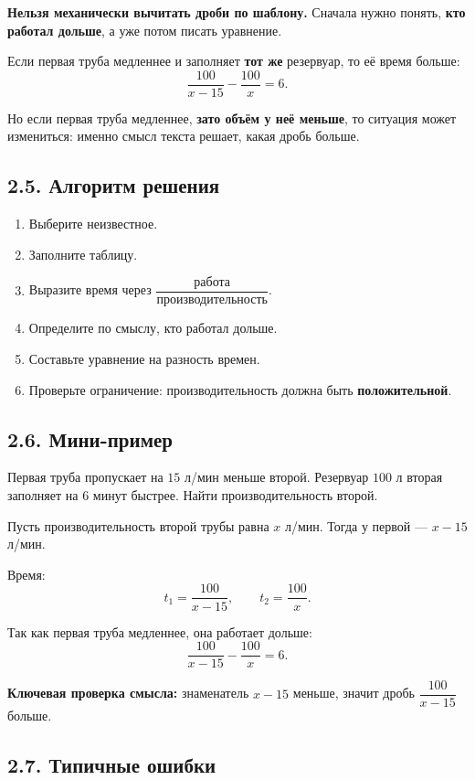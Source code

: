 \documentclass[a4paper,12pt]{article}
\begin{document}
\textbf{Нельзя механически вычитать дроби по шаблону.}  
Сначала нужно понять, \textbf{кто работал дольше}, а уже потом писать уравнение.

Если первая труба медленнее и заполняет \textbf{тот же} резервуар, то её время больше:
\[
\frac{100}{x-15}-\frac{100}{x}=6.
\]

Но если первая труба медленнее, \textbf{зато объём у неё меньше}, то ситуация может измениться: именно смысл текста решает, какая дробь больше.

\subsection*{2.5. Алгоритм решения}

\begin{enumerate}
    \item Выберите неизвестное.
    \item Заполните таблицу.
    \item Выразите время через $\dfrac{\text{работа}}{\text{производительность}}$.
    \item Определите по смыслу, кто работал дольше.
    \item Составьте уравнение на разность времен.
    \item Проверьте ограничение: производительность должна быть \textbf{положительной}.
\end{enumerate}

\subsection*{2.6. Мини-пример}

Первая труба пропускает на $15$ л/мин меньше второй. Резервуар $100$ л вторая заполняет на $6$ минут быстрее. Найти производительность второй.

Пусть производительность второй трубы равна $x$ л/мин. Тогда у первой --- $x-15$ л/мин.

Время:
\[
t_1=\frac{100}{x-15}, \qquad t_2=\frac{100}{x}.
\]

Так как первая труба медленнее, она работает дольше:
\[
\frac{100}{x-15}-\frac{100}{x}=6.
\]

\textbf{Ключевая проверка смысла:} знаменатель $x-15$ меньше, значит дробь $\dfrac{100}{x-15}$ больше.

\subsection*{2.7. Типичные ошибки}
\end{document}
